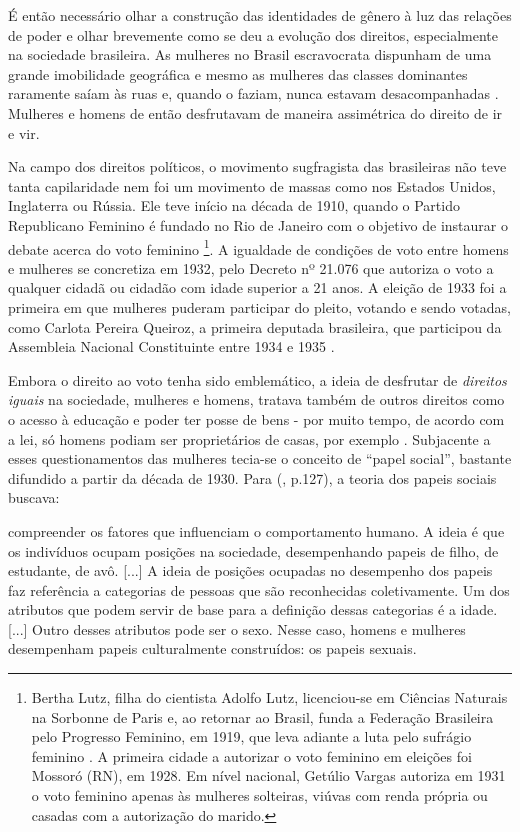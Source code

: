 É então necessário olhar a construção das identidades de gênero à luz das relações de poder e olhar brevemente como se deu a evolução dos direitos, especialmente na sociedade brasileira. As mulheres no Brasil escravocrata dispunham de uma grande imobilidade geográfica e mesmo as mulheres das classes dominantes raramente saíam às ruas e, quando o faziam, nunca estavam desacompanhadas \cite{SAFFIOTI2013}. Mulheres e homens de então desfrutavam de maneira assimétrica do direito de ir e vir.

Na campo dos direitos políticos, o movimento sugfragista das brasileiras não teve tanta capilaridade nem foi um movimento de massas como nos Estados Unidos, Inglaterra ou Rússia. Ele teve início na década de 1910, quando o Partido Republicano Feminino é fundado no Rio de Janeiro com o objetivo de instaurar o debate acerca do voto feminino 
\footnote{
Bertha Lutz, filha do cientista Adolfo Lutz, licenciou-se em Ciências Naturais na Sorbonne de Paris e, ao retornar ao Brasil, funda a Federação Brasileira pelo Progresso Feminino, em 1919, que leva adiante a luta pelo sufrágio feminino \cite{PINSKY2003}. A primeira cidade a autorizar o voto feminino em eleições foi Mossoró (RN), em 1928. Em nível nacional, Getúlio Vargas autoriza em 1931 o voto feminino apenas às mulheres solteiras, viúvas com renda própria ou casadas com a autorização do marido.}.
A igualdade de condições de voto entre homens e mulheres se concretiza em 1932, pelo Decreto nº 21.076 que autoriza o voto a qualquer cidadã ou cidadão com idade superior a 21 anos. A eleição de 1933 foi a primeira em que mulheres puderam participar do pleito, votando e sendo votadas, como Carlota Pereira Queiroz, a primeira deputada brasileira, que participou da Assembleia Nacional Constituinte entre 1934 e 1935 \cite{TABAK1989}.

Embora o direito ao voto tenha sido emblemático, a ideia de desfrutar de \emph{direitos iguais} na sociedade, mulheres e homens, tratava também de outros direitos como o acesso à educação e poder ter posse de bens - por muito tempo, de acordo com a lei, só homens podiam ser proprietários de casas, por exemplo \cite{PISCITELLI2009}. Subjacente a esses questionamentos das mulheres tecia-se o conceito de ``papel social'', bastante difundido a partir da década de 1930. Para  (\citeyear{PISCITELLI2009}, p.127), a teoria dos papeis sociais buscava:

\begin{citacao}
compreender os fatores que influenciam o comportamento humano. A ideia é que os indivíduos ocupam posições na sociedade, desempenhando papeis de filho, de estudante, de avô. [...] A ideia de posições ocupadas no desempenho dos papeis faz referência a categorias de pessoas que são reconhecidas coletivamente. Um dos atributos que podem servir de base para a definição dessas categorias é a idade. [...] Outro desses atributos pode ser o sexo. Nesse caso, homens e mulheres desempenham papeis culturalmente construídos: os papeis sexuais.
\end{citacao}

